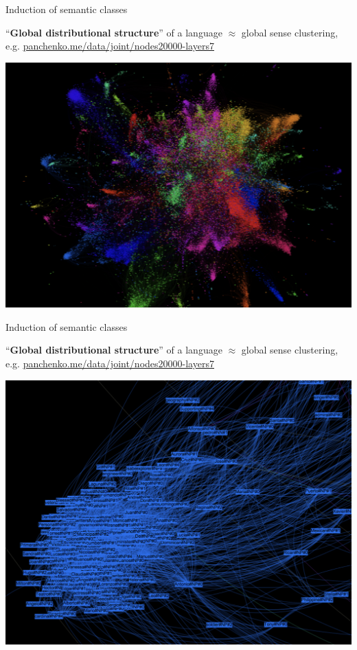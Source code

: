 \documentclass[usenames,dvipsnames]{beamer}
\begin{document}
\begin{frame}{Induction of semantic classes}

``\textbf{\alert{Global distributional structure}}'' of a language $\approx$ global sense clustering, e.g. {\footnotesize \underline{\url{panchenko.me/data/joint/nodes20000-layers7}}}

\vspace{-5pt}
\begin{center}
\includegraphics[width=.7\textwidth]{figures/structure}
\end{center}

\end{frame}



\begin{frame}{Induction of semantic classes}

``\textbf{\alert{Global distributional structure}}'' of a language $\approx$ global sense clustering, e.g. {\footnotesize \underline{\url{panchenko.me/data/joint/nodes20000-layers7}}}

\vspace{-5pt}
\begin{center}
\includegraphics[width=.65\textwidth]{figures/structure1.png}
\end{center}

\end{frame}
\end{document}
